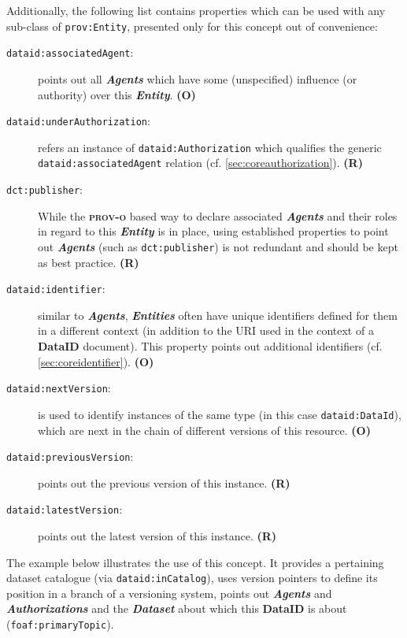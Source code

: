 \documentclass[a4paper,english,twoside,BCOR1.5cm,headsepline,DIV12,appendixprefix,final,12pt]{scrbook}
\newcommand{\dataid}{{\ttfamily\bfseries DataID}\xspace}
\newcommand{\prov}{{\scshape\bfseries prov-o}\xspace}
\newcommand{\prop}[1]{{{\texttt{#1}}}}
\newcommand{\important}[1]{\textbf{\textit{#1}}}
\begin{document}
Additionally, the following list contains properties which can be used with any sub-class of \prop{prov:Entity}, presented only for this concept out of convenience:
\begin{description}
\item[\prop{dataid:associatedAgent}:] points out all \important{Agents} which have some (unspecified) influence (or authority) over this \important{Entity}. \textbf{(O)}
\item[\prop{dataid:underAuthorization}:] refers an instance of \prop{dataid:Authorization} which qualifies the generic \prop{dataid:associatedAgent} relation (cf. \cref{sec:coreauthorization}). \textbf{(R)}
\item[\prop{dct:publisher}:] While the \prov based way to declare associated \important{Agents} and their roles in regard to this \important{Entity} is in place, using established properties to point out \important{Agents} (such as \prop{dct:publisher}) is not redundant and should be kept as best practice. \textbf{(R)}
\item[\prop{dataid:identifier}:] similar to \important{Agents}, \important{Entities} often have unique identifiers defined for them in a different context (in addition to the URI used in the context of a \dataid document). This property points out additional identifiers (cf. \cref{sec:coreidentifier}). \textbf{(O)}
\item[\prop{dataid:nextVersion}:] is used to identify instances of the same type (in this case \prop{dataid:DataId}), which are next in the chain of different versions of this resource. \textbf{(O)}
\item[\prop{dataid:previousVersion}:] points out the previous version of this instance. \textbf{(R)}
\item[\prop{dataid:latestVersion}:] points out the latest version of this instance. \textbf{(R)}
\end{description}

The example below illustrates the use of this concept. It provides a pertaining dataset catalogue (via \prop{dataid:inCatalog}), uses version pointers to define its position in a branch of a versioning system, points out \important{Agents} and \important{Authorizations} and the \important{Dataset} about which this \dataid is about (\prop{foaf:primaryTopic}).
\end{document}
